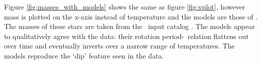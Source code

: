 Figure \ref{fig:masses_with_models} shows the same as figure \ref{fig:vplot},
however mass is plotted on the x-axis instead of temperature and the models
are those of \citet{spada2019}.
The masses of these stars are taken from the \kepler\ input catalog
\citep{KIC}.
The \citet{spada2019} models appear to qualitatively agree with the data:
their rotation period-\teff\ relation flattens out over time and eventually
inverts over a narrow range of temperatures.
The models reproduce the `dip' feature seen in the data.





